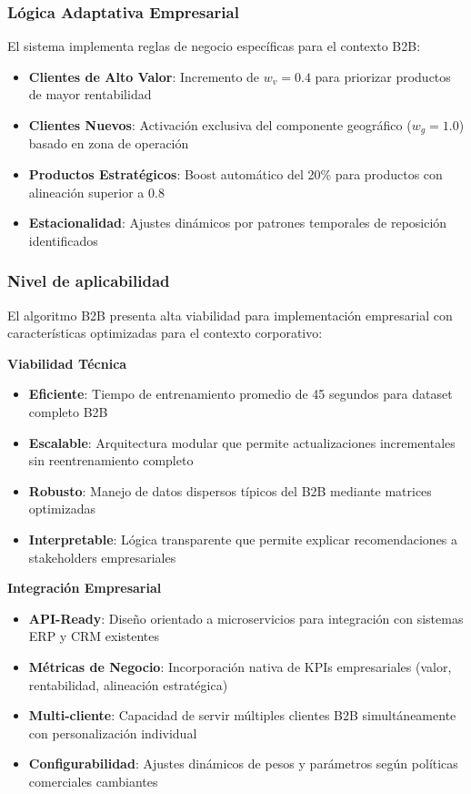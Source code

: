 \documentclass[twocolumn]{article}
\begin{document}
\subsubsection{Lógica Adaptativa Empresarial}

El sistema implementa reglas de negocio específicas para el contexto B2B:

\begin{itemize}
    \item \textbf{Clientes de Alto Valor}: Incremento de \(w_v = 0.4\) para priorizar productos de mayor rentabilidad
    \item \textbf{Clientes Nuevos}: Activación exclusiva del componente geográfico (\(w_g = 1.0\)) basado en zona de operación
    \item \textbf{Productos Estratégicos}: Boost automático del 20\% para productos con alineación superior a 0.8
    \item \textbf{Estacionalidad}: Ajustes dinámicos por patrones temporales de reposición identificados
\end{itemize}

\subsubsection{Nivel de aplicabilidad}

El algoritmo B2B presenta alta viabilidad para implementación empresarial con características optimizadas para el contexto corporativo:

\textbf{Viabilidad Técnica}
\begin{itemize}
    \item \textbf{Eficiente}: Tiempo de entrenamiento promedio de 45 segundos para dataset completo B2B
    \item \textbf{Escalable}: Arquitectura modular que permite actualizaciones incrementales sin reentrenamiento completo
    \item \textbf{Robusto}: Manejo de datos dispersos típicos del B2B mediante matrices optimizadas
    \item \textbf{Interpretable}: Lógica transparente que permite explicar recomendaciones a stakeholders empresariales
\end{itemize}

\textbf{Integración Empresarial}
\begin{itemize}
    \item \textbf{API-Ready}: Diseño orientado a microservicios para integración con sistemas ERP y CRM existentes
    \item \textbf{Métricas de Negocio}: Incorporación nativa de KPIs empresariales (valor, rentabilidad, alineación estratégica)
    \item \textbf{Multi-cliente}: Capacidad de servir múltiples clientes B2B simultáneamente con personalización individual
    \item \textbf{Configurabilidad}: Ajustes dinámicos de pesos y parámetros según políticas comerciales cambiantes
\end{itemize}
\end{document}
